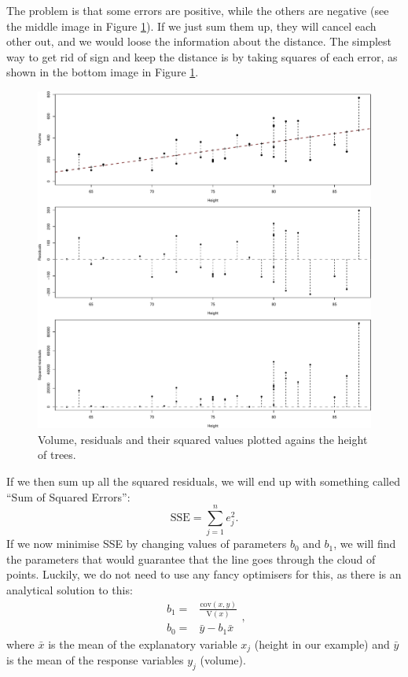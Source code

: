 \documentclass[
]{book}
\theoremstyle{definition}
\theoremstyle{definition}
\theoremstyle{definition}
\theoremstyle{definition}
\theoremstyle{remark}
\begin{document}
The problem is that some errors are positive, while the others are negative (see the middle image in Figure \ref{fig:TreesModelOLSResid}). If we just sum them up, they will cancel each other out, and we would loose the information about the distance. The simplest way to get rid of sign and keep the distance is by taking squares of each error, as shown in the bottom image in Figure \ref{fig:TreesModelOLSResid}.

\begin{figure}
\centering
\includegraphics{Svetunkov---Statistics-for-Business-Analytics_files/figure-latex/TreesModelOLSResid-1.pdf}
\caption{\label{fig:TreesModelOLSResid}Volume, residuals and their squared values plotted agains the height of trees.}
\end{figure}

If we then sum up all the squared residuals, we will end up with something called ``Sum of Squared Errors'':
\begin{equation}
    \mathrm{SSE} = \sum_{j=1}^n e_j^2 .
    \label{eq:OLSCriterion}
\end{equation}
If we now minimise SSE by changing values of parameters \({b}_0\) and \({b}_1\), we will find the parameters that would guarantee that the line goes through the cloud of points. Luckily, we do not need to use any fancy optimisers for this, as there is an analytical solution to this:
\begin{equation}
    \begin{aligned}
        {b}_1 = & \frac{\mathrm{cov}(x,y)}{\mathrm{V}(x)} \\
        {b}_0 = & \bar{y} - {b}_1 \bar{x}
    \end{aligned} ,
    \label{eq:OLSSLREstimates}
\end{equation}
where \(\bar{x}\) is the mean of the explanatory variable \(x_j\) (height in our example) and \(\bar{y}\) is the mean of the response variables \(y_j\) (volume).
\end{document}
